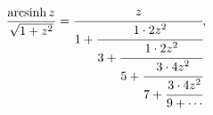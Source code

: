 \[\frac{\mathop{\mathrm{arcsinh}\/}\nolimits z}{\sqrt{1+z^{2}}}=\cfrac{z}{1+%
\cfrac{1\cdot 2z^{2}}{3+\cfrac{1\cdot 2z^{2}}{5+\cfrac{3\cdot 4z^{2}}{7+\cfrac%
{3\cdot 4z^{2}}{9+\cdots}}}}},\]
